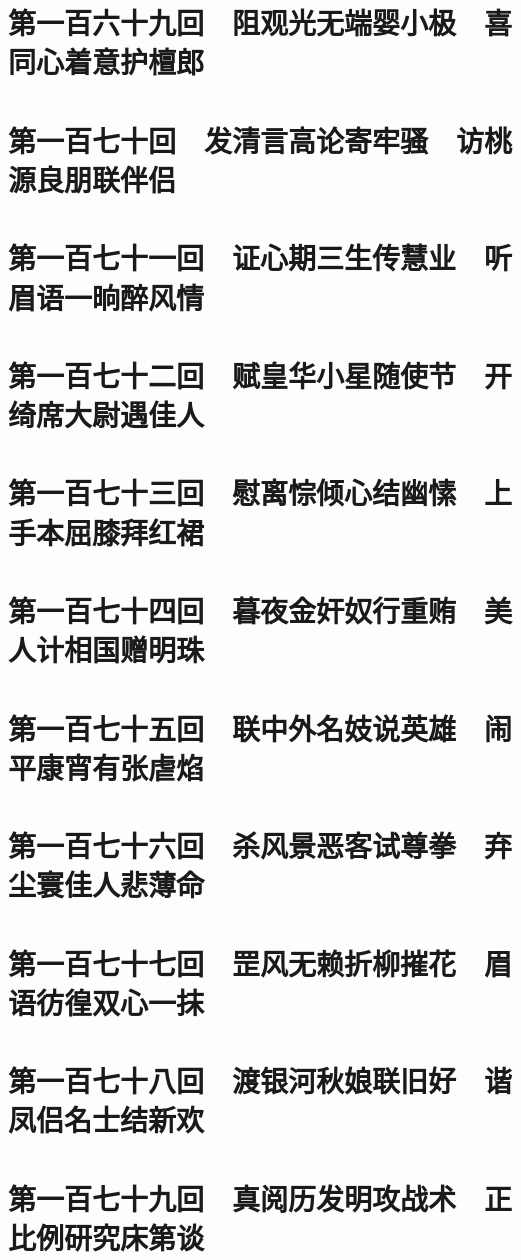 \documentclass[12pt,UTF8]{ctexbook}
\begin{document}
{{{\chapter{第一百六十九回　阻观光无端婴小极　喜同心着意护檀郎}

\chapter{第一百七十回　发清言高论寄牢骚　访桃源良朋联伴侣}
\chapter{第一百七十一回　证心期三生传慧业　听眉语一晌醉风情}

\chapter{第一百七十二回　赋皇华小星随使节　开绮席大尉遇佳人}

\chapter{第一百七十三回　慰离悰倾心结幽愫　上手本屈膝拜红裙}

\chapter{第一百七十四回　暮夜金奸奴行重贿　美人计相国赠明珠}

\chapter{第一百七十五回　联中外名妓说英雄　闹平康宵有张虐焰}

\chapter{第一百七十六回　杀风景恶客试尊拳　弃尘寰佳人悲薄命}

\chapter{第一百七十七回　罡风无赖折柳摧花　眉语彷徨双心一抹}

\chapter{第一百七十八回　渡银河秋娘联旧好　谐凤侣名士结新欢}

\chapter{第一百七十九回　真阅历发明攻战术　正比例研究床第谈}

}}}
\end{document}
